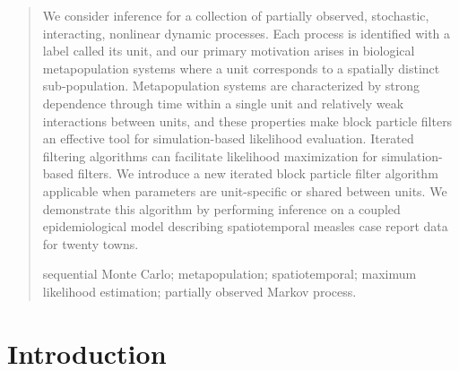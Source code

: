 \documentclass[12pt]{article}\usepackage[]{graphicx}\usepackage[]{xcolor}
\renewcommand{\theequation}{\thesection\arabic{equation}}
\begin{document}
\begin{quotation}
We consider inference for a collection of partially observed, stochastic, interacting, nonlinear dynamic processes.
Each process is identified with a label called its unit, and our primary motivation arises in biological metapopulation systems where a unit corresponds to a spatially distinct sub-population.
Metapopulation systems are characterized by strong dependence through time within a single unit and relatively weak interactions between units, and these properties make block particle filters an effective tool for simulation-based likelihood evaluation. 
Iterated filtering algorithms can facilitate likelihood maximization for simulation-based filters.
We introduce a new iterated block particle filter algorithm applicable when parameters are unit-specific or shared between units.
We demonstrate this algorithm by performing inference on a coupled epidemiological model describing spatiotemporal measles case report data for twenty towns.

\vspace{9pt}
sequential Monte Carlo; metapopulation; spatiotemporal; maximum likelihood estimation; partially observed Markov process.
\par
\end{quotation}\par



\def\thefigure{\arabic{figure}}
\def\thetable{\arabic{table}}

\renewcommand{\theequation}{\thesection.\arabic{equation}}


\fontsize{12}{14pt plus.8pt minus .6pt}\selectfont




\date{}


\section{Introduction}
\label{sec:intro}
\end{document}
